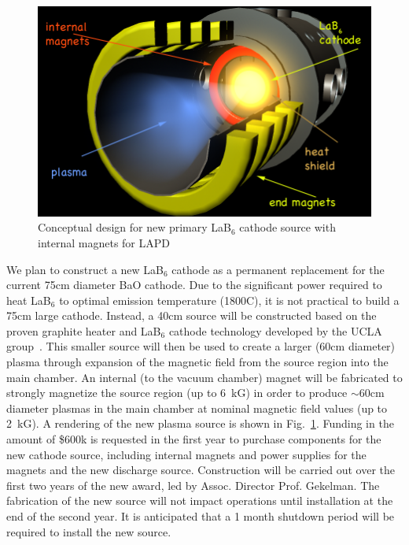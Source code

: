 \documentclass[11pt]{article}
\renewcommand{\cite}{\citep}
\begin{document}
\begin{figure}
\begin{center}
\includegraphics[width=3.5truein]{lab6-proposal}
\caption{Conceptual design for new primary LaB$_6$ cathode source with
  internal magnets for LAPD}\label{newcath}
\end{center}
\end{figure}

We plan to construct a new LaB$_6$ cathode as a permanent replacement
for the current 75cm diameter BaO cathode.  Due to the significant power
required to heat LaB$_6$ to optimal emission temperature (1800C), it
is not practical to build a 75cm large cathode.  Instead, a 40cm source will
be constructed based on the proven graphite heater and LaB$_6$ cathode
technology developed by the UCLA group~\cite{cooper:2010}.  This smaller source will then
be used to create a larger (60cm diameter) plasma through expansion of
the magnetic field from the source region into the main chamber.  An
internal (to the vacuum chamber) magnet will be fabricated to strongly
magnetize the source region (up to 6~kG) in order to produce $\sim
60$cm diameter plasmas in the main chamber at nominal magnetic field
values (up to 2~kG).  A rendering of the new plasma source is shown in
Fig.~\ref{newcath}.  Funding in the amount of \$600k is
requested in the first year to purchase components for the new
cathode source, including internal magnets and power supplies for the
magnets and the new discharge source.  Construction  will be carried
out over the first two years of the new award, led by Assoc. Director
Prof. Gekelman.  The fabrication of the new source will not impact
operations until installation at the end of the second year.  It is
anticipated that a 1 month shutdown period will be required to install
the new source.  
\end{document}
